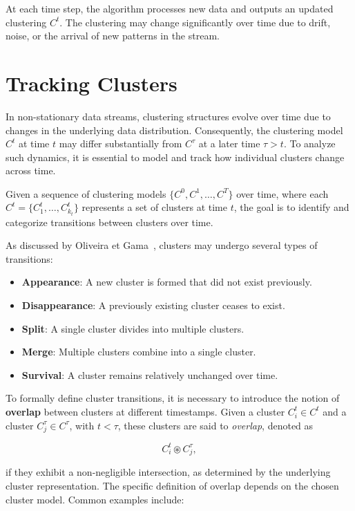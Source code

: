 At each time step, the algorithm processes new data and outputs an updated
clustering $C^t$. The clustering may change significantly over time due to
drift, noise, or the arrival of new patterns in the stream.

\section{Tracking Clusters}\label{sec:prob_tracking_clusters}
In non-stationary data streams, clustering structures evolve over time due to
changes in the underlying data distribution. Consequently, the clustering model
$C^t$ at time $t$ may differ substantially from $C^\tau$ at a later time $\tau
    > t$. To analyze such dynamics, it is essential to model and track how
individual clusters change across time.

Given a sequence of clustering models $\{C^0, C^1, \dots, C^T\}$ over time,
where each $C^t = \{C_1^t, \dots, C_{k_t}^t\}$ represents a set of clusters at
time $t$, the goal is to identify and categorize transitions between clusters
over time.

As discussed by Oliveira et Gama~\cite{mec}, clusters may undergo several types
of transitions:

\begin{itemize}
    \item \textbf{Appearance}: A new cluster is formed that did not exist previously.
    \item \textbf{Disappearance}: A previously existing cluster ceases to exist.
    \item \textbf{Split}: A single cluster divides into multiple clusters.
    \item \textbf{Merge}: Multiple clusters combine into a single cluster.
    \item \textbf{Survival}: A cluster remains relatively unchanged over time.
\end{itemize}

To formally define cluster transitions, it is necessary to introduce the notion
of \textbf{overlap} between clusters at different timestamps. Given a cluster $
    C_i^t \in C^t $ and a cluster $ C_j^\tau \in C^\tau $, with $ t < \tau $, these
clusters are said to \emph{overlap}, denoted as

\begin{equation}
    C_i^t \circledast C_j^\tau,
\end{equation}

if they exhibit a non-negligible intersection, as determined by the underlying
cluster representation. The specific definition of overlap depends on the
chosen cluster model. Common examples include:


